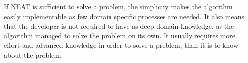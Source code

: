 If NEAT is sufficient to solve a problem, the simplicity makes the algorithm easily implementable as few domain specific processes are needed. It also means that the developer is not required to have as deep domain knowledge, as the algorithm managed to solve the problem on its own. It usually requires more effort and advanced knowledge in order to solve a problem, than it is to know about the problem.





